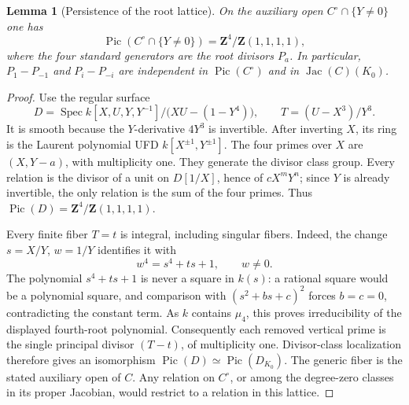 \documentclass[11pt,a4paper]{article}
\newtheorem{lemma}[theorem]{Lemma}
\theoremstyle{remark}
\begin{document}
\begin{lemma}[Persistence of the root lattice]
\label{lem:quarticrootlattice}
On the auxiliary open $C^\circ\cap\{Y\ne0\}$ one has
\[
 \operatorname{Pic}(C^\circ\cap\{Y\ne0\})
   =\mathbf Z^4/\mathbf Z(1,1,1,1),
\]
where the four standard generators are the root divisors $P_a$.
In particular, $P_1-P_{-1}$ and $P_i-P_{-i}$ are independent in
$\operatorname{Pic}(C^\circ)$ and in $\operatorname{Jac}(C)(K_0)$.
\end{lemma}
\begin{proof}
Use the regular surface
\[
 D=\operatorname{Spec}
   k[X,U,Y,Y^{-1}]/\bigl(XU-(1-Y^4)\bigr),
 \qquad T=(U-X^3)/Y^3.
\]
It is smooth because the $Y$-derivative $4Y^3$ is invertible.
After inverting $X$, its ring is the Laurent polynomial UFD
$k[X^{\pm1},Y^{\pm1}]$. The four primes over $X$ are
$(X,Y-a)$, with multiplicity one. They generate the divisor class
group. Every relation is the divisor of a unit on $D[1/X]$, hence
of $cX^mY^n$; since $Y$ is already invertible, the only relation is
the sum of the four primes. Thus
$\operatorname{Pic}(D)=\mathbf Z^4/\mathbf Z(1,1,1,1)$.

Every finite fiber $T=t$ is integral, including singular fibers.
Indeed, the change $s=X/Y$, $w=1/Y$ identifies it with
\[
 w^4=s^4+ts+1,\qquad w\ne0.
\]
The polynomial $s^4+ts+1$ is never a square in $k(s)$: a rational
square would be a polynomial square, and comparison with
$(s^2+bs+c)^2$ forces $b=c=0$, contradicting the constant term.
As $k$ contains $\mu_4$, this proves irreducibility of the displayed
fourth-root polynomial. Consequently each removed vertical prime is
the single principal divisor $(T-t)$, of multiplicity one.
Divisor-class localization therefore gives an isomorphism
$\operatorname{Pic}(D)\simeq\operatorname{Pic}(D_{K_0})$.
The generic fiber is the stated auxiliary open of $C$.
Any relation on $C^\circ$, or among the degree-zero classes in its
proper Jacobian, would restrict to a relation in this lattice.
\end{proof}
\end{document}
